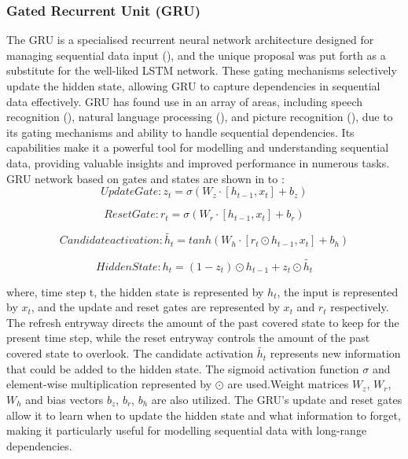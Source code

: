 \documentclass[a4paper, fleqn]{cas-sc}
\theoremstyle{definition}
\theoremstyle{remark}
\begin{document}
\subsubsection{Gated Recurrent Unit (GRU)}
The GRU is a specialised recurrent neural network architecture designed for managing sequential data input  (\cite{chung2014empirical}), and the unique proposal was put forth as a substitute for the well-liked LSTM network. These gating mechanisms selectively update the hidden state,  allowing GRU to capture dependencies in sequential data effectively. GRU has found use in an array of areas,  including speech recognition (\cite{shewalkar2019performance, yuan2018auxiliary}),  natural language processing (\cite{cascianelli2018full, wang2020feature}),  and picture recognition (\cite{subramanian2022integrated}),  due to its gating mechanisms and ability to handle sequential dependencies. Its capabilities make it a powerful tool for modelling and understanding sequential data,  providing valuable insights and improved performance in numerous tasks. GRU network based on gates and states are shown in  to : \\

 
\begin{equation} \label{up Gru}
  Update Gate :  z_t= \sigma(W_{z}\cdot \left[ h_{t-1}, x_t \right]+b_z )
\end{equation}

\begin{equation}\label{r gru}
  Reset Gate :  r_t=\sigma (W_{r}\cdot \left[ h_{t-1}, x_t \right]+b_r )
\end{equation}

\begin{equation} \label{can gru}
  Candidate activation :  \tilde{h_t}=tanh(W_h \cdot \left[ r_t \odot h_{t-1}, x_t \right]+b_h)
\end{equation}

\begin{equation} \label{hid gru}
  Hidden State :   h_t=(1-z_t) \odot h_{t-1}+z_t \odot \tilde{h_t}
\end{equation}



where,  time step t,  the hidden state is represented by $ h_t $,  the input is represented by $ x_t $,  and the update and reset gates are
represented by $ x_t $ and $ r_t$ respectively. The refresh entryway directs the amount of the past covered state to keep for the present time step,  while the reset entryway controls the amount of the past covered state to overlook. The candidate activation $\tilde{h_t}$ represents new information that could be added to the hidden state. The sigmoid activation function $ \sigma $ and element-wise multiplication represented by $\odot$ are used.Weight matrices $ W_z $,  $ W_r $,  $ W_h $ and bias vectors $ b_z $,  $ b_r $,  $ b_h $ are also utilized. The GRU's update and reset gates allow it to learn when to update the hidden state and what information to forget,  making it particularly useful for modelling sequential data with long-range dependencies.
\end{document}
